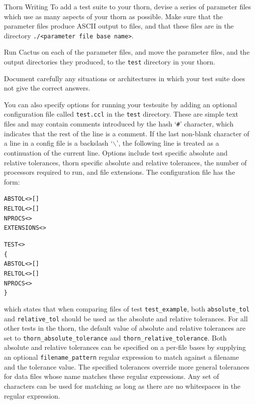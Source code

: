 \begin{cactuspart}{Thorn Writing}
To add a test suite to your thorn, devise a series of parameter
files which use as many aspects of your thorn as possible.
Make sure that the parameter files produce ASCII output to files,
and that these files are in the directory
\texttt{./<parameter file base name>}.

Run Cactus on each of the parameter files, and move the parameter files,
and the output directories they produced, to the \texttt{test} directory
in your thorn.

Document carefully any situations or architectures in which your test
suite does not give the correct answers.

You can also specify options for running your testsuite by adding an
optional configuration file called \texttt{test.ccl} in the \texttt{test}
directory. These are simple text files and may contain comments
introduced by the hash `\texttt{\#}' character, which indicates that the
rest of the line is a comment. If the last non-blank character of a
line in a config file is a backslash `\texttt{$\backslash$}', the
following line is treated as a continuation of the current line.
Options include test specific absolute and relative tolerances, thorn
specific absolute and relative tolerances, the number of processors required
to run, and file extensions. The configuration file has the form:

\begin{alltt}
ABSTOL  <> []
RELTOL  <> []
NPROCS  <>
EXTENSIONS  <  >

TEST <>
\{
  ABSTOL <> []
  RELTOL <> []
  NPROCS <>
\}
\end{alltt}

which states that when comparing files of test \verb|test_example|, both
\verb|absolute_tol| and \verb|relative_tol| should be used as
the absolute and relative tolerances. For all other tests in the
thorn, the default value of absolute and relative tolerances are set
to \verb|thorn_absolute_tolerance| and \verb|thorn_relative_tolerance|.
Both absolute and relative tolerances can be specified on a per-file
bases by supplying an optional \verb|filename_pattern| regular expression
to match against a filename and the tolerance value. The specified
tolerances override more general tolerances for data files whose name
matches these regular expressions. Any set of characters can be used for
matching as long as there are no whitespaces in the regular expression.


\end{cactuspart}
